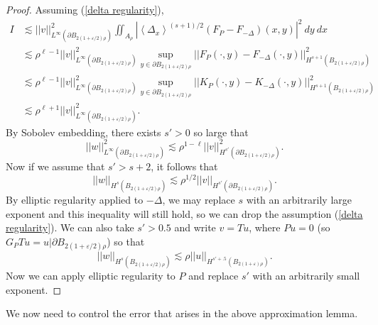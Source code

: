 \documentclass[reqno,12pt,letterpaper]{amsart}
\def\Japan#1{\left \langle #1 \right \rangle}
\theoremstyle{definition}
\numberwithin{equation}{section}
\begin{document}
\begin{proof}
Assuming (\ref{delta regularity}),
\begin{align*}
I &\lesssim ||v||_{L^\infty(\partial B_{2(1 + \varepsilon/2)\rho})}^2 \iint_{A_\rho} |\Japan{\Delta_x}^{(s+1)/2}(F_P - F_{-\Delta})(x, y)|^2 ~dy ~dx\\
&\lesssim \rho^{\ell - 1} ||v||_{L^\infty(\partial B_{2(1 + \varepsilon/2)\rho})}^2 \sup_{y \in \partial B_{2(1 + \varepsilon/2)\rho}} ||F_P(\cdot, y) - F_{-\Delta}(\cdot, y)||_{H^{s + 1}(B_{2(1 + \varepsilon/2)\rho})}^2\\
&\lesssim \rho^{\ell - 1} ||v||_{L^\infty(\partial B_{2(1 + \varepsilon/2)\rho})}^2 \sup_{y \in \partial B_{2(1 + \varepsilon/2)\rho}} ||K_P(\cdot, y) - K_{-\Delta}(\cdot, y)||_{H^{s + 1}(B_{2(1 + \varepsilon/2)\rho})}^2\\
&\lesssim \rho^{\ell + 1} ||v||_{L^\infty(\partial B_{2(1 + \varepsilon/2)\rho})}^2.
\end{align*}
By Sobolev embedding, there exists $s' > 0$ so large that
$$||w||_{L^\infty(\partial B_{2(1 + \varepsilon/2)\rho})}^2 \lesssim \rho^{1-\ell} ||v||_{H^{s'}(\partial B_{2(1 + \varepsilon/2)\rho})}^2.$$
Now if we assume that $s' > s + 2$, it follows that
$$||w||_{H^s(B_{2(1 + \varepsilon/2)\rho})} \lesssim \rho^{1/2} ||v||_{H^{s'}(\partial B_{2(1 + \varepsilon/2)\rho})}.$$
By elliptic regularity applied to $-\Delta$, we may replace $s$ with an arbitrarily large exponent and this inequality will still hold, so we can drop the assumption (\ref{delta regularity}).
We can also take $s' > 0.5$ and write $v = Tu$, where $Pu = 0$ (so $G_PTu = u|\partial B_{2(1 + \varepsilon/2)\rho}$) so that
$$||w||_{H^s(B_{2(1 + \varepsilon/2)\rho})} \lesssim \rho ||u||_{H^{s' + .5}(B_{2(1 + \varepsilon)\rho})}.$$
Now we can apply elliptic regularity to $P$ and replace $s'$ with an arbitrarily small exponent.
\end{proof}

We now need to control the error that arises in the above approximation lemma.
\end{document}
